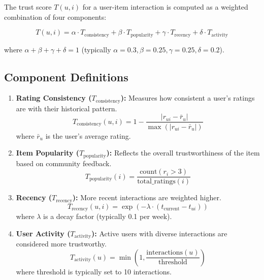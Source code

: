 The trust score $T(u,i)$ for a user-item interaction is computed as a weighted combination of four components:

\begin{equation}
T(u,i) = \alpha \cdot T_{\text{consistency}} + \beta \cdot T_{\text{popularity}} + \gamma \cdot T_{\text{recency}} + \delta \cdot T_{\text{activity}}
\end{equation}

where $\alpha + \beta + \gamma + \delta = 1$ (typically $\alpha=0.3, \beta=0.25, \gamma=0.25, \delta=0.2$).

\subsection{Component Definitions}

\begin{enumerate}
    \item \textbf{Rating Consistency ($T_{\text{consistency}}$):} Measures how consistent a user's ratings are with their historical pattern.
    \begin{equation}
    T_{\text{consistency}}(u,i) = 1 - \frac{|r_{ui} - \bar{r}_u|}{\max(|r_{ui} - \bar{r}_u|)}
    \end{equation}
    where $\bar{r}_u$ is the user's average rating.
    
    \item \textbf{Item Popularity ($T_{\text{popularity}}$):} Reflects the overall trustworthiness of the item based on community feedback.
    \begin{equation}
    T_{\text{popularity}}(i) = \frac{\text{count}(r_i > 3)}{\text{total\_ratings}(i)}
    \end{equation}
    
    \item \textbf{Recency ($T_{\text{recency}}$):} More recent interactions are weighted higher.
    \begin{equation}
    T_{\text{recency}}(u,i) = \exp(-\lambda \cdot (t_{\text{current}} - t_{ui}))
    \end{equation}
    where $\lambda$ is a decay factor (typically 0.1 per week).
    
    \item \textbf{User Activity ($T_{\text{activity}}$):} Active users with diverse interactions are considered more trustworthy.
    \begin{equation}
    T_{\text{activity}}(u) = \min\left(1, \frac{\text{interactions}(u)}{\text{threshold}}\right)
    \end{equation}
    where threshold is typically set to 10 interactions.
\end{enumerate}

